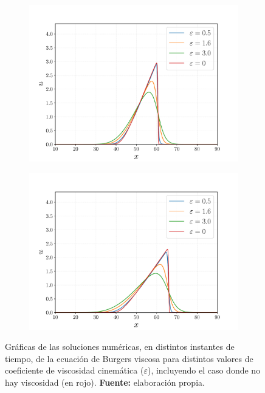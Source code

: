 \begin{figure}[ht]
\begin{subfigure}{0.5\textwidth}
		\includegraphics[width=\linewidth]{../some_plots/burgers-viscosas/graficas/viscosidades-200.pdf}
		\label{fig:viscosas3}
	\end{subfigure}
	\begin{subfigure}{0.5\textwidth}
		\centering
		\includegraphics[width=\linewidth]{../some_plots/burgers-viscosas/graficas/viscosidades-400.pdf}
		\label{fig:viscosas4}
	\end{subfigure}
	\caption{Gráficas de las soluciones numéricas, en distintos instantes de tiempo, de la ecuación de Burgers viscosa para distintos valores de coeficiente de viscosidad cinemática ($\varepsilon$), incluyendo el caso donde no hay viscosidad (en rojo). \textbf{Fuente:} elaboración propia.}
	\label{fig:viscosas}
\end{figure}

